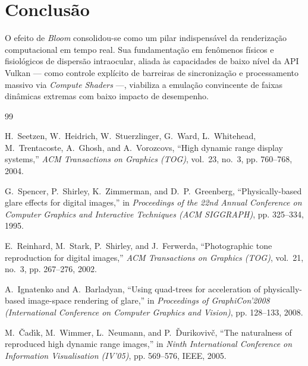 \documentclass[12pt,a4paper]{article}
\begin{document}








\section{Conclusão}
O efeito de \textit{Bloom} consolidou-se como um pilar indispensável da renderização computacional em tempo real. Sua fundamentação em fenômenos físicos e fisiológicos de dispersão intraocular, aliada às capacidades de baixo nível da API Vulkan --- como controle explícito de barreiras de sincronização e processamento massivo via \textit{Compute Shaders} ---, viabiliza a emulação convincente de faixas dinâmicas extremas com baixo impacto de desempenho.

\begin{thebibliography}{99}

H.~Seetzen, W.~Heidrich, W.~Stuerzlinger, G.~Ward, L.~Whitehead, M.~Trentacoste, A.~Ghosh, and A.~Vorozcovs, 
``High dynamic range display systems,'' 
\emph{ACM Transactions on Graphics (TOG)}, vol.~23, no.~3, pp. 760--768, 2004.

G.~Spencer, P.~Shirley, K.~Zimmerman, and D.~P.~Greenberg, 
``Physically-based glare effects for digital images,'' 
in \emph{Proceedings of the 22nd Annual Conference on Computer Graphics and Interactive Techniques (ACM SIGGRAPH)}, pp. 325--334, 1995.

E.~Reinhard, M.~Stark, P.~Shirley, and J.~Ferwerda, 
``Photographic tone reproduction for digital images,'' 
\emph{ACM Transactions on Graphics (TOG)}, vol.~21, no.~3, pp. 267--276, 2002.

A.~Ignatenko and A.~Barladyan, 
``Using quad-trees for acceleration of physically-based image-space rendering of glare,'' 
in \emph{Proceedings of GraphiCon'2008 (International Conference on Computer Graphics and Vision)}, pp. 128--133, 2008.

M.~{\v{C}}ad{\'\i}k, M.~Wimmer, L.~Neumann, and P.~{\v{D}}urikoviv{\v{c}}, 
``The naturalness of reproduced high dynamic range images,'' 
in \emph{Ninth International Conference on Information Visualisation (IV'05)}, pp. 569--576, IEEE, 2005.

\end{thebibliography}
\end{document}

